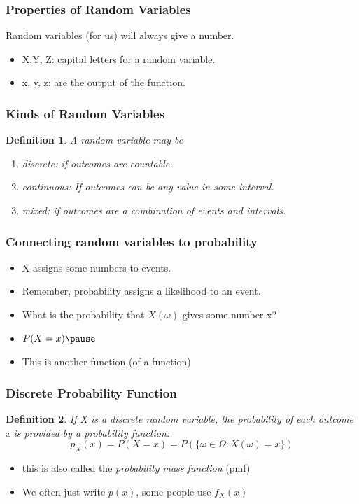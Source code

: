 \documentclass[handout]{beamer}
\newtheorem{defn}{Definition}
\numberwithin{equation}{section}
\begin{document}
\begin{frame}
\frametitle{Properties of Random Variables}

Random variables (for us) will always give a number.
\begin{itemize}
\item X,Y, Z: capital letters for a random variable.
\item x, y, z: are the output of the function.
\end{itemize}
\end{frame}


\begin{frame}
\frametitle{Kinds of Random Variables}
\begin{defn}
A random variable may be 
\begin{enumerate}
\item discrete: if outcomes are countable.
\item continuous: If outcomes can be any value in some interval.
\item mixed: if outcomes are a combination of events and intervals.
\end{enumerate}
\end{defn}
\end{frame}


\begin{frame}
\frametitle{Connecting random variables to probability}
\begin{itemize}
\item X assigns some numbers to events.\pause
\item Remember, probability assigns a likelihood to an event.\pause
\item What is the probability that $X(\omega)$ gives some number x?\pause
\item $P(X=x)\pause $
\item This is another function (of a function)
\end{itemize}
\end{frame}


\begin{frame}
\frametitle{Discrete Probability Function}
\begin{defn}

If X is a discrete random variable, the probability of each outcome x is provided by a probability function:
$$p_X(x)=P(X=x)=P(\{\omega \in \Omega: X(\omega)=x\})$$

\end{defn}
\begin{itemize}
\item this is also called the \emph{probability mass function} (pmf)
\item We often just write $p(x)$, some people use $f_X(x)$
\end{itemize}

\end{frame}
\end{document}
